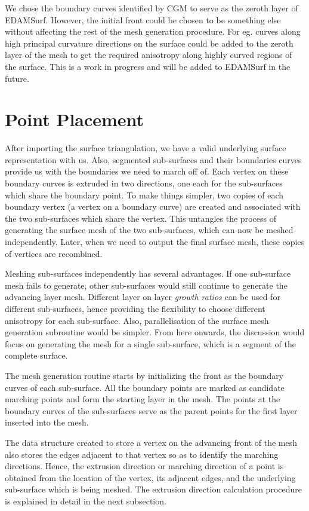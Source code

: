 We chose the boundary curves identified by CGM to serve as the zeroth layer of EDAMSurf. However, the initial front could be chosen to be something else without affecting the rest of the mesh generation procedure. For eg. curves along high principal curvature directions on the surface could be added to the zeroth layer of the mesh to get the required anisotropy along highly curved regions of the surface. This is a work in progress and will be added to EDAMSurf in the future.

\section{Point Placement}

After importing the surface triangulation, we have a valid underlying surface representation with us. Also, segmented sub-surfaces and their boundaries curves provide us with the boundaries we need to march off of. Each vertex on these boundary curves is extruded in two directions, one each for the sub-surfaces which share the boundary point. To make things simpler, two copies of each boundary vertex (a vertex on a boundary curve) are created and associated with the two sub-surfaces which share the vertex. This untangles the process of generating the surface mesh of the two sub-surfaces, which can now be meshed independently. Later, when we need to output the final surface mesh, these copies of vertices are recombined.

Meshing sub-surfaces independently has several advantages. If one sub-surface mesh fails to generate, other sub-surfaces would still continue to generate the advancing layer mesh. Different layer on layer \textit{growth ratios} can be used for different sub-surfaces, hence providing the flexibility to choose different anisotropy  for each sub-surface. Also, parallelisation of the surface mesh generation subroutine would be simpler. From here onwards,  the discussion would focus on generating the mesh for a single sub-surface, which is a segment of the complete surface. 

The mesh generation routine starts by initializing the front as the boundary curves of each sub-surface. All the boundary points are marked as candidate marching points and form the starting layer in the mesh. The points at the boundary curves of the sub-surfaces serve as the parent points for the first layer inserted into the mesh.

The data structure created to store a vertex on the advancing front of the mesh also stores the edges adjacent to that vertex so as to identify the marching directions. Hence, the extrusion direction or marching direction of a point is obtained from the location of the vertex, its adjacent edges, and the underlying sub-surface which is being meshed. The extrusion direction calculation procedure is explained in detail in the next subsection.

